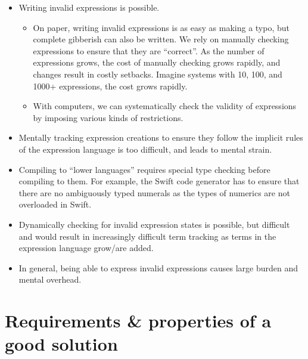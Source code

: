 \begin{itemize}

      \item Writing invalid expressions is possible.
            \begin{itemize}

                  \item On paper, writing invalid expressions is as easy as
                        making a typo, but complete gibberish can also be
                        written. We rely on manually checking expressions to
                        ensure that they are ``correct''. As the number of
                        expressions grows, the cost of manually checking grows
                        rapidly, and changes result in costly setbacks. Imagine
                        systems with 10, 100, and 1000+ expressions, the cost
                        grows rapidly.

                  \item With computers, we can systematically check the validity
                        of expressions by imposing various kinds of
                        restrictions.

            \end{itemize}

      \item Mentally tracking expression creations to ensure they follow the
            implicit rules of the expression language is too difficult, and
            leads to mental strain.

      \item Compiling to ``lower languages'' requires special type checking
            before compiling to them. For example, the Swift code generator has
            to ensure that there are no ambiguously typed numerals as the types
            of numerics are not overloaded in Swift.

      \item Dynamically checking for invalid expression states is possible, but
            difficult and would result in increasingly difficult term tracking
            as terms in the expression language grow/are added.

      \item In general, being able to express invalid expressions causes large
            burden and mental overhead.

\end{itemize}


\section{Requirements \& properties of a good solution}

